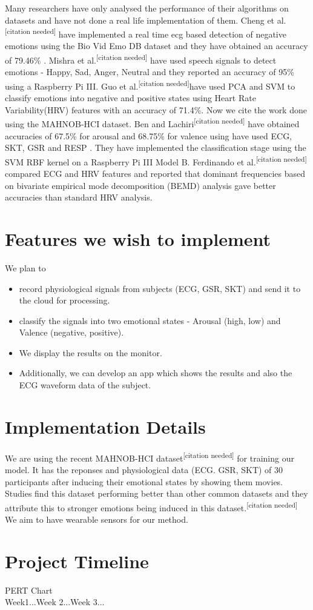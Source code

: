 \documentclass[11pt]{article}
\theoremstyle{definition}
\begin{document}
    Many researchers have only analysed the performance of their algorithms on datasets and have not done a real life implementation of them.
    Cheng et al.\textsuperscript{[citation needed]} have implemented a real time ecg based detection of negative emotions using the Bio Vid Emo DB dataset and they have obtained an accuracy of 79.46\% . 
    Mishra et al.\textsuperscript{[citation needed]} have used speech signals to detect emotions - Happy, Sad, Anger, Neutral and they reported an accuracy of 95\% using a Raspberry Pi III.
    Guo et al.\textsuperscript{[citation needed]}have used PCA and SVM to classify emotions into negative and positive states using Heart Rate Variability(HRV) features with an accuracy of 71.4\%.
    Now we cite the work done using the MAHNOB-HCI dataset. 
    Ben and Lachiri\textsuperscript{[citation needed]} have obtained accuracies of 67.5\% for arousal and 68.75\% for valence using have used ECG, SKT, GSR and RESP . They have implemented the classification stage using the SVM RBF kernel on a Raspberry Pi III Model B.
    Ferdinando et al.\textsuperscript{[citation needed]} compared ECG and HRV features and reported that dominant frequencies based on
    bivariate empirical mode decomposition (BEMD) analysis gave better accuracies than standard HRV analysis.
   
  \section{Features we wish to implement}
    We plan to 
    \begin{itemize}
      \item record physiological signals from subjects (ECG, GSR, SKT) and send it to the cloud for processing.
      \item classify the signals into two emotional states - Arousal (high, low) and Valence (negative, positive).\cite{ben_emotion_2017}
      \item We display the results on the monitor.
      \item Additionally, we can develop an app which shows the results and also the ECG waveform data of the subject.
    \end{itemize}

  \section{Implementation Details}
    We are using the recent MAHNOB-HCI dataset\textsuperscript{[citation needed]} for training our model. It has the reponses and physiological data (ECG. GSR, SKT) of 30 participants after inducing their emotional states by showing them movies. Studies find this dataset performing better than other common datasets and they attribute this to stronger emotions being induced in this dataset.\textsuperscript{[citation needed]}\\
    We aim to have wearable sensors for our method.

  \section{Project Timeline}
    PERT Chart\\
    Week1...Week 2...Week 3...
  
  \newpage
  
  
\end{document}
